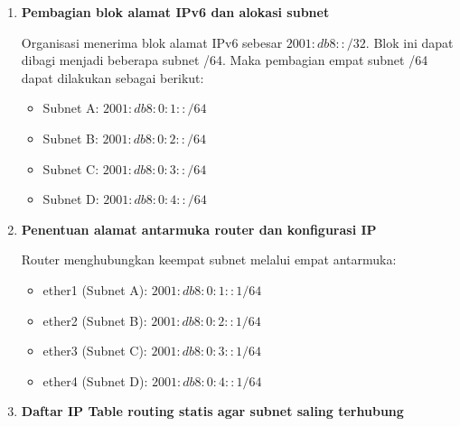 \begin{enumerate}
	\item \textbf{Pembagian blok alamat IPv6 dan alokasi subnet}

	Organisasi menerima blok alamat IPv6 sebesar \(2001:db8::/32\). Blok ini dapat dibagi menjadi beberapa subnet /64. Maka pembagian empat subnet /64 dapat dilakukan sebagai berikut:

	\begin{itemize}
		\item Subnet A: \(2001:db8:0:1::/64\)
		\item Subnet B: \(2001:db8:0:2::/64\)
		\item Subnet C: \(2001:db8:0:3::/64\)
		\item Subnet D: \(2001:db8:0:4::/64\)
	\end{itemize}

	\item \textbf{Penentuan alamat antarmuka router dan konfigurasi IP}

	Router menghubungkan keempat subnet melalui empat antarmuka:
	\begin{itemize}
		\item ether1 (Subnet A): \(2001:db8:0:1::1/64\)
		\item ether2 (Subnet B): \(2001:db8:0:2::1/64\)
		\item ether3 (Subnet C): \(2001:db8:0:3::1/64\)
		\item ether4 (Subnet D): \(2001:db8:0:4::1/64\)
	\end{itemize}



	\item \textbf{Daftar IP Table routing statis agar subnet saling terhubung}


\end{enumerate}
